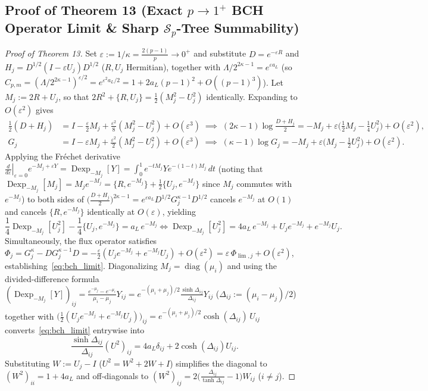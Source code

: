 \documentclass[10pt,letterpaper]{article}
\newcommand{\Sp}{\mathcal{S}_p}
\newcommand{\diag}{\operatorname{diag}}
\begin{document}
\subsection{Proof of Theorem 13 (Exact \texorpdfstring{$p \to 1^+$}{p -> 1+} BCH Operator Limit \& Sharp \texorpdfstring{$\Sp$}{S\_p}-Tree Summability)}

\begin{proof}[Proof of Theorem 13]
Set $\varepsilon := 1/\kappa = \frac{2(p-1)}{p} \to 0^+$ and substitute $D = e^{-\varepsilon R}$ and $H_j = D^{1/2}(I - \varepsilon U_j)D^{1/2}$ ($R, U_j$ Hermitian), together with $\Lambda / 2^{2\kappa - 1} = e^{\varepsilon a_L}$ (so $C_{p,m} = (\Lambda / 2^{2\kappa-1})^{\varepsilon/2} = e^{\varepsilon^2 a_L / 2} = 1 + 2a_L(p-1)^2 + O((p-1)^3)$). Let $M_j := 2R + U_j$, so that $2R^2 + \{R, U_j\} = \frac{1}{2}(M_j^2 - U_j^2)$ identically. Expanding to $O(\varepsilon^2)$ gives
\begin{align*}
  \tfrac{1}{2}(D + H_j) &= I - \tfrac{\varepsilon}{2} M_j + \tfrac{\varepsilon^2}{8}(M_j^2 - U_j^2) + O(\varepsilon^3)
  \;\implies\; (2\kappa - 1)\log\tfrac{D + H_j}{2} = -M_j + \varepsilon\bigl(\tfrac{1}{2}M_j - \tfrac{1}{4}U_j^2\bigr) + O(\varepsilon^2), \\
  G_j &= I - \varepsilon M_j + \tfrac{\varepsilon^2}{2}(M_j^2 - U_j^2) + O(\varepsilon^3)
  \;\implies\; (\kappa - 1)\log G_j = -M_j + \varepsilon\bigl(M_j - \tfrac{1}{2}U_j^2\bigr) + O(\varepsilon^2).
\end{align*}
Applying the Fr\'echet derivative $\left.\frac{d}{d\varepsilon}\right|_{\varepsilon=0} e^{-M_j + \varepsilon Y} = \operatorname{Dexp}_{-M_j}[Y] = \int_0^1 e^{-tM_j} Y e^{-(1-t)M_j}\,dt$ (noting that $\operatorname{Dexp}_{-M_j}[M_j] = M_j e^{-M_j} = \{R, e^{-M_j}\} + \frac{1}{2}\{U_j, e^{-M_j}\}$ since $M_j$ commutes with $e^{-M_j}$) to both sides of $\bigl(\frac{D+H_j}{2}\bigr)^{2\kappa-1} = e^{\varepsilon a_L} D^{1/2} G_j^{\kappa-1} D^{1/2}$ cancels $e^{-M_j}$ at $O(1)$ and cancels $\{R, e^{-M_j}\}$ identically at $O(\varepsilon)$, yielding
\[
  \frac{1}{4}\operatorname{Dexp}_{-M_j}[U_j^2] - \frac{1}{4}\{U_j, e^{-M_j}\} = a_L\, e^{-M_j}
  \iff \operatorname{Dexp}_{-M_j}[U_j^2] = 4a_L\, e^{-M_j} + U_j e^{-M_j} + e^{-M_j} U_j.
\]
Simultaneously, the flux operator satisfies $\Phi_j = G_j^\kappa - D G_j^{\kappa-1} D = -\frac{\varepsilon}{2}(U_j e^{-M_j} + e^{-M_j} U_j) + O(\varepsilon^2) = \varepsilon\,\Phi_{\lim,j} + O(\varepsilon^2)$, establishing~\eqref{eq:bch_limit}. Diagonalizing $M_j = \diag(\mu_i)$ and using the divided-difference formula $(\operatorname{Dexp}_{-M_j}[Y])_{ij} = \frac{e^{-\mu_j} - e^{-\mu_i}}{\mu_i - \mu_j} Y_{ij} = e^{-(\mu_i+\mu_j)/2}\frac{\sinh\Delta_{ij}}{\Delta_{ij}} Y_{ij}$ ($\Delta_{ij} := (\mu_i - \mu_j)/2$) together with $\bigl(\frac{1}{2}(U_j e^{-M_j} + e^{-M_j} U_j)\bigr)_{ij} = e^{-(\mu_i+\mu_j)/2}\cosh(\Delta_{ij})\, U_{ij}$ converts~\eqref{eq:bch_limit} entrywise into
\[
  \frac{\sinh\Delta_{ij}}{\Delta_{ij}}(U^2)_{ij} = 4a_L \delta_{ij} + 2\cosh(\Delta_{ij}) U_{ij}.
\]
Substituting $W := U_j - I$ ($U^2 = W^2 + 2W + I$) simplifies the diagonal to $(W^2)_{ii} = 1 + 4a_L$ and off-diagonals to $(W^2)_{ij} = 2\bigl(\frac{\Delta_{ij}}{\tanh\Delta_{ij}} - 1\bigr)W_{ij}$ ($i \neq j$).


\end{proof}
\end{document}
